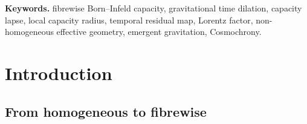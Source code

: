 \documentclass[11pt,a4paper]{article}
\begin{document}
\begin{abstract}
    \textbf{Interpretive reading.}
    The purpose of this note is not to rederive the Einstein equation.
    The weak-field metric is supplied: no paper of the programme derives a Lorentzian metric or the Einstein
    equations from the spectral functional, which the Gravity paper studies on Riemannian metrics.
    The purpose is instead to identify the local kinematic meaning of gravitational time
    dilation in the capacity-flow language:
    a non-uniform projected configuration reduces the local Born--Infeld capacity radius,
    and the temporal residual map becomes fibrewise.
    In summary, under [H-cone] and the occupancy--lapse postulate: special-relativistic time dilation is the
    homogeneous capacity trade-off
    between spatial mobility and temporal residual capacity;
    gravitational time dilation is the fibrewise version of the same trade-off, in which
    the available capacity radius is reduced by local spectral occupancy.
  \end{abstract}

  \noindent\textbf{Keywords.}
  fibrewise Born--Infeld capacity, gravitational time dilation, capacity lapse,
  local capacity radius, temporal residual map, Lorentz factor, non-homogeneous
  effective geometry, emergent gravitation, Cosmochrony.

  \newpage
  \tableofcontents

  \newpage

  \section{Introduction}

    \subsection{From homogeneous to fibrewise}
\end{document}
